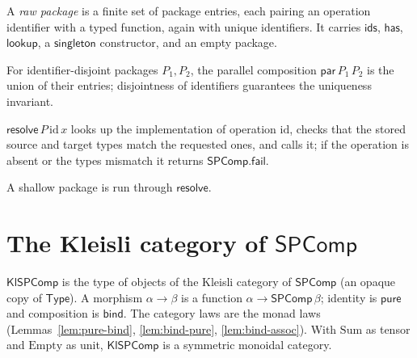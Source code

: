 \begin{definition}
  \label{def:rawpackage}
  \leanok
  A \emph{raw package} is a finite set of package entries, each pairing an
  operation identifier with a typed function, again with unique identifiers. It
  carries $\mathsf{ids}$, $\mathsf{has}$, $\mathsf{lookup}$, a $\mathsf{singleton}$
  constructor, and an empty package.
\end{definition}

\begin{definition}
  \label{def:rawpackage-par}
  \leanok
  For identifier-disjoint packages $P_1, P_2$, the parallel composition
  $\mathsf{par}\,P_1\,P_2$ is the union of their entries; disjointness of
  identifiers guarantees the uniqueness invariant.
\end{definition}

\begin{definition}
  \label{def:rawpackage-resolve}
  \leanok
  $\mathsf{resolve}\,P\,\mathrm{id}\,x$ looks up the implementation of
  operation $\mathrm{id}$, checks that the stored source and target types match
  the requested ones, and calls it; if the operation is absent or the types
  mismatch it returns $\mathsf{SPComp.fail}$.
\end{definition}

A shallow package is run through $\mathsf{resolve}$.


\section{The Kleisli category of \texorpdfstring{$\mathsf{SPComp}$}{SPComp}}

\begin{definition}
  \label{def:klspcomp}
  \leanok
  $\mathsf{KlSPComp}$ is the type of objects of the Kleisli category of
  $\mathsf{SPComp}$ (an opaque copy of $\mathsf{Type}$). A morphism $\alpha \to
  \beta$ is a function $\alpha \to \mathsf{SPComp}\,\beta$; identity is
  $\mathsf{pure}$ and composition is $\mathsf{bind}$. The category laws are the
  monad laws (Lemmas~\ref{lem:pure-bind}, \ref{lem:bind-pure},
  \ref{lem:bind-assoc}). With $\mathrm{Sum}$ as tensor and $\mathrm{Empty}$ as
  unit, $\mathsf{KlSPComp}$ is a symmetric monoidal category.
\end{definition}

